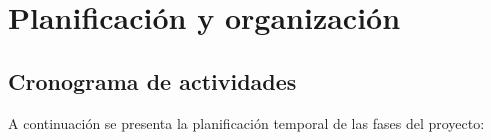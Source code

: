 \section{Planificación y organización}
\label{sec:planificacion}

\subsection{Cronograma de actividades}
A continuación se presenta la planificación temporal de las fases del proyecto:


